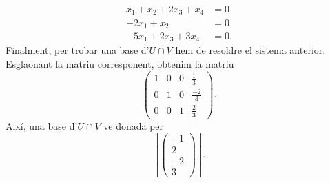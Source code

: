 \begin{exemple}
\begin{align*}
    x_1+x_2+2x_3+x_4&=0\\
    -2x_1+x_2 &= 0\\
    -5x_1 +2x_3+3x_4&=0.
        \end{align*}
        Finalment, per trobar una base d'$U\cap V$ hem de resoldre el sistema anterior. Esglaonant la matriu corresponent, obtenim la matriu
        \[
        \left(\begin{array}{rrrr}
        1&0&0&\frac{1}{3}\\
        0&1&0&\frac{-2}{3}\\
        0&0&1&\frac{2}{3}
        \end{array}\right).
        \]
        Així, una base d'$U\cap V$ ve donada per
        \[
        \left[\begin{pmatrix}-1\\2\\-2\\3\end{pmatrix}\right].
        \]
        
\end{exemple}
